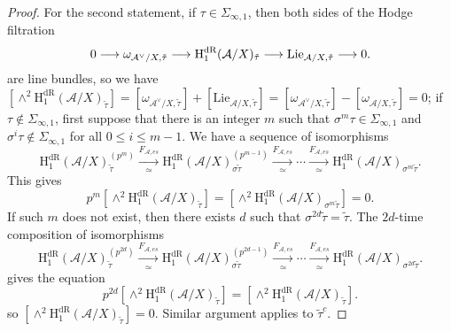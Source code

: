 \documentclass{article}
\begin{document}
\begin{proof}
For the second statement, if $\tau\in \Sigma_{\infty,1}$, then both sides of the Hodge filtration 
\begin{equation}
	0\longrightarrow \omega_{\mathcal{A}^\vee/X,\tilde\tau}\longrightarrow \textnormal{H}_1^{\textnormal{dR}}(\mathcal{A}/X)_{\tilde\tau}\longrightarrow \text{Lie}_{\mathcal{A}/X,\tilde\tau}\longrightarrow0.
\end{equation}
are line bundles, so we have $[\wedge^2 \text{H}^{\text{dR}}_1(\mathcal{A}/X)_{\tilde\tau}]=[\omega_{\mathcal{A}^\vee/X,\tilde\tau}]+[\text{Lie}_{\mathcal{A}/X,\tilde\tau}]=[\omega_{\mathcal{A}^\vee/X,\tilde\tau}]-[\omega_{\mathcal{A}/X,\tilde\tau}]=0$; if $\tau\notin \Sigma_{\infty,1}$, first suppose that there is an integer $m$ such that $\sigma^{m}\tau\in\Sigma_{\infty,1}$ and $\sigma^{i}\tau\notin\Sigma_{\infty,1}$ for all $0\le i\le m-1$. We have a sequence of isomorphisms
\begin{equation}
\text{H}_1^{\text{dR}}(\mathcal{A}/X)_{\tilde\tau}^{(p^m)}\xrightarrow[\simeq]{F_{\mathcal{A},es}}\text{H}_1^{\text{dR}}(\mathcal{A}/X)_{\sigma\tilde\tau}^{(p^{m-1})}\xrightarrow[\simeq]{F_{\mathcal{A},es}}\cdots\xrightarrow[\simeq]{F_{\mathcal{A},es}}\text{H}^{\text{dR}}_1(\mathcal{A}/X)_{\sigma^m\tilde\tau}.
\end{equation}
This gives
\begin{equation}
p^{m}[\wedge^2 \text{H}^{\text{dR}}_1(\mathcal{A}/X)_{\tilde\tau}]=[\wedge^2 \text{H}^{\text{dR}}_1(\mathcal{A}/X)_{\sigma^m\tilde\tau}]=0.
\end{equation}
If such $m$ does not exist, then there exists $d$ such that $\sigma^{2d}\tilde\tau=\tilde\tau$. The $2d$-time composition of isomorphisms
\begin{equation}
\text{H}_1^{\text{dR}}(\mathcal{A}/X)_{\tilde\tau}^{(p^{2d})}\xrightarrow[\simeq]{F_{\mathcal{A},es}}\text{H}_1^{\text{dR}}(\mathcal{A}/X)_{\sigma\tilde\tau}^{(p^{2d-1})}\xrightarrow[\simeq]{F_{\mathcal{A},es}}\cdots\xrightarrow[\simeq]{F_{\mathcal{A},es}}\text{H}^{\text{dR}}_1(\mathcal{A}/X)_{\sigma^{2d}\tilde\tau}.
\end{equation}
gives the equation
\begin{equation}
p^{2d}[\wedge^2 \text{H}^{\text{dR}}_1(\mathcal{A}/X)_{\tilde\tau}]=[\wedge^2 \text{H}^{\text{dR}}_1(\mathcal{A}/X)_{\tilde\tau}].
\end{equation}
so $[\wedge^2 \text{H}^{\text{dR}}_1(\mathcal{A}/X)_{\tilde\tau}]=0$. Similar argument applies to $\tilde\tau^c$.


\end{proof}
\end{document}
